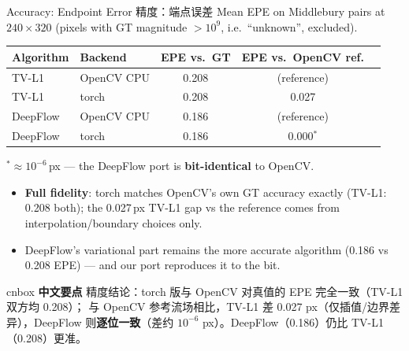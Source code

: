 \documentclass[aspectratio=169,10pt]{beamer}
\newcommand{\zh}[1]{{\zhfont #1}}
\newenvironment{cn}{%
  \begin{beamercolorbox}[rounded=true,sep=4pt,wd=\textwidth]{cnbox}\zhfont\footnotesize
  {\color{cblue!70!black}\textbf{中文要点}}\quad}%
  {\end{beamercolorbox}}
\newcommand{\tvlCvEpeGt}{0.208}   %
\newcommand{\dfCvEpeGt}{0.186}    %
\newcommand{\tvlTorchEpeGt}{0.208}%
\newcommand{\tvlTorchEpeCv}{0.027}%
\newcommand{\dfTorchEpeGt}{0.186} %
\newcommand{\dfTorchEpeCv}{0.000} %
\begin{document}
\begin{frame}{Accuracy: Endpoint Error \zh{精度：端点误差}}
  \centering
  {\small Mean EPE on Middlebury pairs at $240{\times}320$
   (pixels with GT magnitude $>10^9$, i.e.\ ``unknown'', excluded).}
  \par\medskip
  \begin{tabular}{@{}llccc@{}}
    \toprule
    Algorithm & Backend & EPE vs.\ GT & EPE vs.\ OpenCV ref. \\
    \midrule
    TV-L1    & OpenCV CPU & \tvlCvEpeGt & (reference) \\
    TV-L1    & torch      & \tvlTorchEpeGt & \tvlTorchEpeCv \\
    \midrule
    DeepFlow & OpenCV CPU & \dfCvEpeGt & (reference) \\
    DeepFlow & torch      & \dfTorchEpeGt & \dfTorchEpeCv$^{*}$ \\
    \bottomrule
  \end{tabular}
  \par\smallskip
  {\scriptsize $^{*}$$\approx 10^{-6}$\,px --- the DeepFlow port is
   \textbf{bit-identical} to OpenCV.}
  \par\smallskip
  \begin{itemize}
    \item \textbf{Full fidelity}: torch matches OpenCV's own GT accuracy
      exactly (TV-L1: 0.208 both); the 0.027\,px TV-L1 gap vs the reference
      comes from interpolation/boundary choices only.
    \item DeepFlow's variational part remains the more accurate algorithm
      (0.186 vs 0.208 EPE) --- and our port reproduces it to the bit.
  \end{itemize}
  \vfill
  \begin{cn}
    精度结论：torch 版与 OpenCV 对真值的 EPE 完全一致（TV-L1 双方均 0.208）；
    与 OpenCV 参考流场相比，TV-L1 差 0.027 px（仅插值/边界差异），DeepFlow
    则\textbf{逐位一致}（差约 $10^{-6}$ px）。DeepFlow（0.186）仍比
    TV-L1（0.208）更准。
  \end{cn}
\end{frame}
\end{document}
